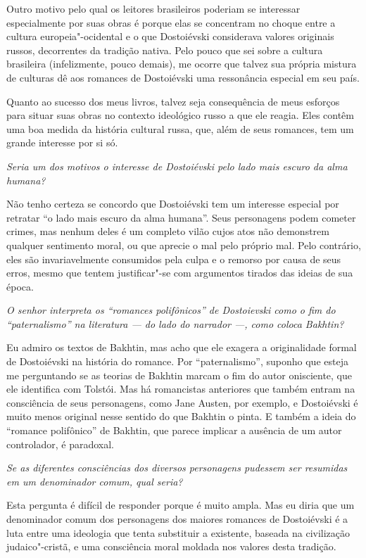 Outro motivo pelo qual os leitores brasileiros poderiam se interessar
especialmente por suas obras é porque elas se concentram no choque entre
a cultura europeia"-ocidental e o que Dostoiévski considerava valores
originais russos, decorrentes da tradição nativa. Pelo pouco que sei
sobre a cultura brasileira (infelizmente, pouco demais), me
ocorre que talvez sua própria mistura de culturas dê aos romances de
Dostoiévski uma ressonância especial em seu país.

Quanto ao sucesso dos meus livros, talvez seja consequência de meus
esforços para situar suas obras no contexto ideológico russo a que ele
reagia. Eles contêm uma boa medida da história cultural russa, que, além
de seus romances, tem um grande interesse por si só.

\medskip

\emph{Seria um dos motivos o interesse de Dostoiévski pelo lado mais
escuro da alma humana?}

Não tenho certeza se concordo que Dostoiévski tem um interesse
especial por retratar ``o lado mais escuro da alma humana''. Seus
personagens podem cometer crimes, mas nenhum deles é um completo vilão
cujos atos não demonstrem qualquer sentimento moral, ou que aprecie o
mal pelo próprio mal. Pelo contrário, eles são invariavelmente
consumidos pela culpa e o remorso por causa de seus erros, mesmo que
tentem justificar"-se com argumentos tirados das ideias de sua época.

\medskip

\emph{O senhor interpreta os ``romances polifônicos'' de Dostoievski como
o fim do ``paternalismo'' na literatura --- do lado do narrador ---,
como coloca Bakhtin?}

Eu admiro os textos de Bakhtin, mas acho que ele exagera a originalidade
formal de Dostoiévski na história do romance. Por ``paternalismo'',
suponho que esteja me perguntando se as teorias de Bakhtin marcam o fim
do autor onisciente, que ele identifica com Tolstói. Mas há romancistas
anteriores que também entram na consciência de seus personagens, como
Jane Austen, por exemplo, e Dostoiévski é muito menos original nesse
sentido do que Bakhtin o pinta. E também a ideia do ``romance polifônico''
de Bakhtin, que parece implicar a ausência de um autor controlador, é
paradoxal.

\medskip

\emph{Se as diferentes consciências dos diversos personagens pudessem ser
resumidas em um denominador comum, qual seria?}

Esta pergunta é difícil de responder porque é muito ampla. Mas eu diria
que um denominador comum dos personagens dos maiores romances de
Dostoiévski é a luta entre uma ideologia que tenta substituir a
existente, baseada na civilização judaico"-cristã, e uma consciência
moral moldada nos valores desta tradição.

